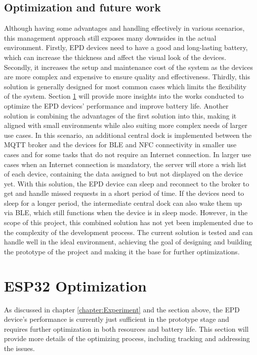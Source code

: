 \documentclass[../Main.tex]{subfiles}
\begin{document}
\subsection{Optimization and future work}
\label{opt}
Although having some advantages and handling effectively in various scenarios, this management approach still exposes many downsides in the actual environment. Firstly, \gls{EPD} devices need to have a good and long-lasting battery, which can increase the thickness and affect the visual look of the devices. Secondly, it increases the setup and maintenance cost of the system as the devices are more complex and expensive to ensure quality and effectiveness. Thirdly, this solution is generally designed for most common cases which limits the flexibility of the system. Section \ref{section:optimization} will provide more insights into the works conducted to optimize the \gls{EPD} devices' performance and improve battery life. Another solution is combining the advantages of the first solution into this, making it aligned with small environments while also suiting more complex needs of larger use cases. In this scenario, an additional central dock is implemented between the MQTT broker and the devices for BLE and NFC connectivity in smaller use cases and for some tasks that do not require an Internet connection. In larger use cases when an Internet connection is mandatory, the server will store a wish list of each device, containing the data assigned to but not displayed on the device yet. With this solution, the \gls{EPD} device can sleep and reconnect to the broker to get and handle missed requests in a short period of time. If the devices need to sleep for a longer period, the intermediate central dock can also wake them up via BLE, which still functions when the device is in sleep mode. However, in the scope of this project, this combined solution has not yet been implemented due to the complexity of the development process. The current solution is tested and can handle well in the ideal environment, achieving the goal of designing and building the prototype of the project and making it the base for further optimizations.

\section{ESP32 Optimization}
\label{section:optimization}
As discussed in chapter \ref{chapter:Experiment} and the section above, the \gls{EPD} device's performance is currently just sufficient in the prototype stage and requires further optimization in both resources and battery life. This section will provide more details of the optimizing process, including tracking and addressing the issues.
\end{document}
